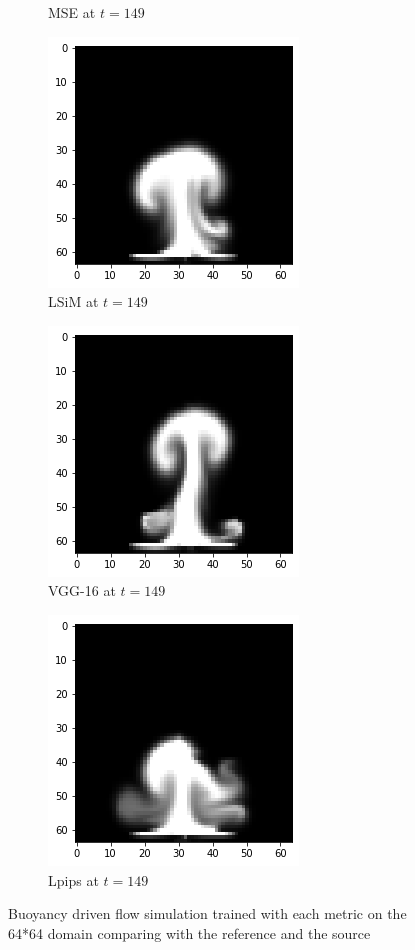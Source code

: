 \documentclass[a4paper,12pt,twoside]{report}
\begin{document}
\begin{figure}
\begin{subfigure}{0.32\textwidth}
			\caption{MSE at $t=149$}
		\end{subfigure}
		\begin{subfigure}{0.32\textwidth}
			\centering
			\includegraphics[scale=0.5]{buoyancy_low/lsim}
			\caption{LSiM at $t=149$}
		\end{subfigure}
		\begin{subfigure}{0.32\textwidth}
			\centering
			\includegraphics[scale=0.5]{buoyancy_low/vgg}
			\caption{VGG-16 at $t=149$}
		\end{subfigure}
		\begin{subfigure}{0.32\textwidth}
			\centering
			\includegraphics[scale=0.5]{buoyancy_low/lpips}
			\caption{Lpips at $t=149$}
		\end{subfigure}
		\caption{Buoyancy driven flow simulation trained with each metric on the 64*64 domain comparing with the reference and the source}
	\end{figure}
	
\end{document}
